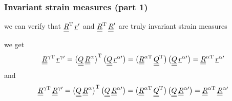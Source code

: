 \begin{frame}
  \frametitle{Invariant strain measures (part 1)}
  
  
  we can verify that $\underline{\underline{R}}^{\mathrm{T}} \, \underline{r}^{\prime}$ and $\underline{\underline{R}}^{\mathrm{T}} \, \underline{\underline{R}}^{\prime}$ are truly invariant strain measures
  
  \vspace{1em}
  we get
  \begin{displaymath}
    \underline{\underline{R}}^{\gamma \mathrm{T}} \, \underline{r}^{\gamma \prime} =
    \bigl( \underline{\underline{Q}} \, \underline{\underline{R}}^{\alpha} \bigr)^{\mathrm{T}} \, \bigl( \underline{\underline{Q}} \, \underline{r}^{\alpha \prime} \bigr) =
    \bigl( \underline{\underline{R}}^{\alpha \mathrm{T}} \, \underline{\underline{Q}}^{\mathrm{T}} \bigr) \, \bigl( \underline{\underline{Q}} \, \underline{r}^{\alpha \prime} \bigr) =
    \underline{\underline{R}}^{\alpha \mathrm{T}} \, \underline{r}^{\alpha \prime}
  \end{displaymath}
  and
  \begin{displaymath}
    \underline{\underline{R}}^{\gamma \mathrm{T}} \, \underline{\underline{R}}^{\gamma \prime} =
    \bigl( \underline{\underline{Q}} \, \underline{\underline{R}}^{\alpha} \bigr)^{\mathrm{T}} \, \bigl( \underline{\underline{Q}} \, \underline{\underline{R}}^{\alpha \prime} \bigr) =
    \bigl( \underline{\underline{R}}^{\alpha \mathrm{T}} \, \underline{\underline{Q}}^{\mathrm{T}} \bigr) \, \bigl( \underline{\underline{Q}} \, \underline{\underline{R}}^{\alpha \prime} \bigr) =
    \underline{\underline{R}}^{\alpha \mathrm{T}} \, \underline{\underline{R}}^{\alpha \prime}
  \end{displaymath}
\end{frame}


